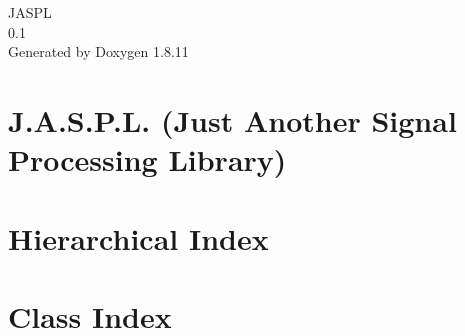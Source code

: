 \documentclass[twoside]{book}
\newcommand{\+}{\discretionary{\mbox{\scriptsize$\hookleftarrow$}}{}{}}
\newcommand{\clearemptydoublepage}{%
  \newpage{\pagestyle{empty}\cleardoublepage}%
}
\begin{document}
\hypersetup{pageanchor=false,
             bookmarksnumbered=true,
             pdfencoding=unicode
            }
\begin{titlepage}
\vspace*{7cm}
\begin{center}%
{\Large J\+A\+S\+PL \\[1ex]\large 0.\+1 }\\
\vspace*{1cm}
{\large Generated by Doxygen 1.8.11}\\
\end{center}
\end{titlepage}
\clearemptydoublepage
\tableofcontents
\clearemptydoublepage
{}
\hypersetup{pageanchor=true}

\chapter{J.\+A.\+S.\+P.\+L. (Just Another Signal Processing Library)}
\label{index}\hypertarget{index}{}
\chapter{Hierarchical Index}

\chapter{Class Index}

\end{document}

